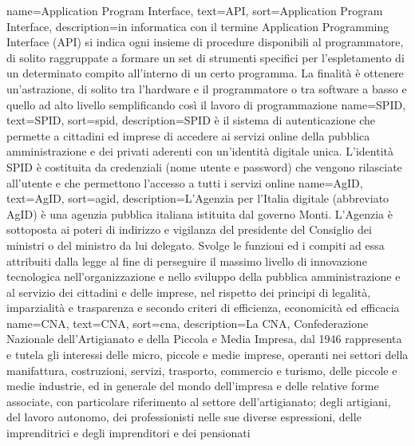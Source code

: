
\begin{comment}
\renewcommand{\acronymname}{Acronimi e abbreviazioni}

\newacronym[description={\glslink{apig}{Application Program Interface}}]
{api}{API}{Application Program Interface}

\newacronymdescription={\glslink{umlg}{Unified Modeling Language}}]
{uml}{UML}{Unified Modeling Language}
\end{comment}
\renewcommand{\glossaryname}{Glossario}

{
    name=Application Program Interface,
    text=API,
    sort=Application Program Interface,
    description={in informatica con il termine Application Programming Interface (API) si indica ogni insieme di procedure disponibili al programmatore, di solito raggruppate a formare un set di strumenti specifici per l'espletamento di un determinato compito all'interno di un certo programma. La finalità è ottenere un'astrazione, di solito tra l'hardware e il programmatore o tra software a basso e quello ad alto livello semplificando così il lavoro di programmazione}
}
{
	name=SPID,
	text=SPID,
	sort=spid,
	description={SPID è il sistema di autenticazione che permette a cittadini ed imprese di accedere ai servizi online della pubblica amministrazione e dei privati aderenti con un’identità digitale unica. L’identità SPID è costituita da credenziali (nome utente e password) che vengono rilasciate all’utente e che permettono l’accesso a tutti i servizi online}
}
{
	name=AgID,
	text=AgID,
	sort=agid,
	description={L'Agenzia per l'Italia digitale (abbreviato AgID) è una agenzia pubblica italiana istituita dal governo Monti. L'Agenzia è sottoposta ai poteri di indirizzo e vigilanza del presidente del Consiglio dei ministri o del ministro da lui delegato. Svolge le funzioni ed i compiti ad essa attribuiti dalla legge al fine di perseguire il massimo livello di innovazione tecnologica nell'organizzazione e nello sviluppo della pubblica amministrazione e al servizio dei cittadini e delle imprese, nel rispetto dei principi di legalità, imparzialità e trasparenza e secondo criteri di efficienza, economicità ed efficacia}
}
{
	name=CNA,
	text=CNA,
	sort=cna,
	description={La CNA, Confederazione Nazionale dell'Artigianato e della Piccola e Media Impresa, dal 1946 rappresenta e tutela gli interessi delle micro, piccole e medie imprese, operanti nei settori della manifattura, costruzioni, servizi, trasporto, commercio e turismo, delle piccole e medie industrie, ed in generale del mondo dell’impresa e delle relative forme associate, con particolare riferimento al settore dell’artigianato; degli artigiani, del lavoro autonomo, dei professionisti  nelle sue diverse espressioni, delle imprenditrici e degli imprenditori e dei pensionati}
}
